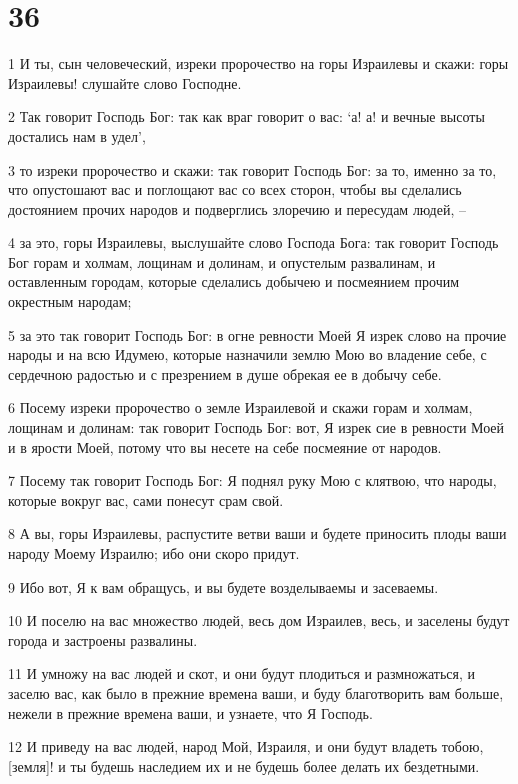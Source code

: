 \chapter{36}

\par 1 И ты, сын человеческий, изреки пророчество на горы Израилевы и скажи: горы Израилевы! слушайте слово Господне.
\par 2 Так говорит Господь Бог: так как враг говорит о вас: `а! а! и вечные высоты достались нам в удел',
\par 3 то изреки пророчество и скажи: так говорит Господь Бог: за то, именно за то, что опустошают вас и поглощают вас со всех сторон, чтобы вы сделались достоянием прочих народов и подверглись злоречию и пересудам людей, --
\par 4 за это, горы Израилевы, выслушайте слово Господа Бога: так говорит Господь Бог горам и холмам, лощинам и долинам, и опустелым развалинам, и оставленным городам, которые сделались добычею и посмеянием прочим окрестным народам;
\par 5 за это так говорит Господь Бог: в огне ревности Моей Я изрек слово на прочие народы и на всю Идумею, которые назначили землю Мою во владение себе, с сердечною радостью и с презрением в душе обрекая ее в добычу себе.
\par 6 Посему изреки пророчество о земле Израилевой и скажи горам и холмам, лощинам и долинам: так говорит Господь Бог: вот, Я изрек сие в ревности Моей и в ярости Моей, потому что вы несете на себе посмеяние от народов.
\par 7 Посему так говорит Господь Бог: Я поднял руку Мою с клятвою, что народы, которые вокруг вас, сами понесут срам свой.
\par 8 А вы, горы Израилевы, распустите ветви ваши и будете приносить плоды ваши народу Моему Израилю; ибо они скоро придут.
\par 9 Ибо вот, Я к вам обращусь, и вы будете возделываемы и засеваемы.
\par 10 И поселю на вас множество людей, весь дом Израилев, весь, и заселены будут города и застроены развалины.
\par 11 И умножу на вас людей и скот, и они будут плодиться и размножаться, и заселю вас, как было в прежние времена ваши, и буду благотворить вам больше, нежели в прежние времена ваши, и узнаете, что Я Господь.
\par 12 И приведу на вас людей, народ Мой, Израиля, и они будут владеть тобою, [земля]! и ты будешь наследием их и не будешь более делать их бездетными.
